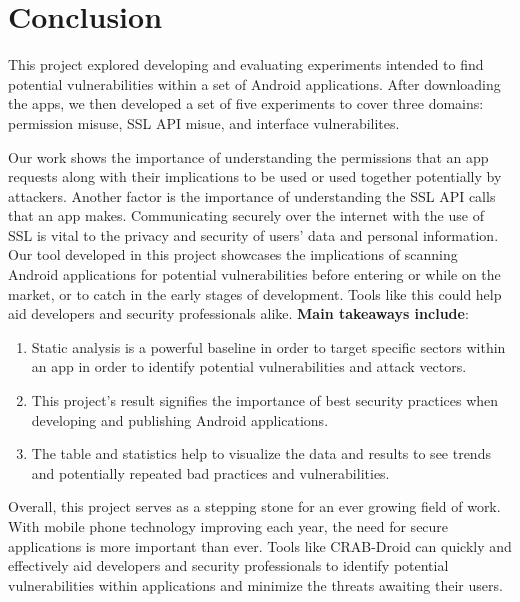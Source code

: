 \section{Conclusion}
\label{sec:conc}


This project explored developing and evaluating experiments intended to find potential vulnerabilities within a set of Android applications. 
After downloading the apps, we then developed a set of five experiments to cover three domains: permission misuse, SSL API misue, and interface vulnerabilites.

Our work shows the importance of understanding the permissions that an app requests along with their implications to be used or used together potentially by attackers. 
Another factor is the importance of understanding the SSL API calls that an app makes. Communicating securely over the internet with the use of SSL is vital to the privacy and security 
of users' data and personal information. Our tool developed in this project showcases the implications of scanning Android applications for potential vulnerabilities before entering or while on the market, 
or to catch in the early stages of development. Tools like this could help aid developers and security professionals alike. 
\bigskip
\newline
\textbf{Main takeaways include}:
\begin{enumerate}
    \item Static analysis is a powerful baseline in order to target specific sectors within an app in order to identify potential vulnerabilities and attack vectors.
    \item This project's result signifies the importance of best security practices when developing and publishing Android applications.
    \item The table and statistics help to visualize the data and results to see trends and potentially repeated bad practices and vulnerabilities. 
\end{enumerate}

Overall, this project serves as a stepping stone for an ever growing field of work. With mobile phone technology improving each year, the need for secure applications is more important than ever.
Tools like CRAB-Droid can quickly and effectively aid developers and security professionals to identify potential vulnerabilities within applications and minimize the threats awaiting their users.

